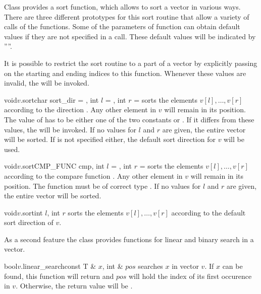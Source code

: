 Class  provides a sort function, which allows to sort a vector in various
ways.  There are three different prototypes for this sort routine that allow a variety of calls
of the functions.  Some of the parameters of function  can obtain default values if
they are not specified in a call.  These default values will be indicated by ''\DEF''.

It is possible to restrict the sort routine to a part of a vector by explicitly passing on the
starting and ending indices to this function.  Whenever these values are invalid, the \LEH will
be invoked.

\begin{fcode}{void}{$v$.sort}{char sort_dir = \DEF, int $l$ = \DEF, int $r$ = \DEF}
  sorts the elements $v[l], \dots, v[r]$ according to the direction .  Any other
  element in $v$ will remain in its position.  The value of  has to be either one of
  the two constants  or .  If it differs from these
  values, the \LEH will be invoked.  If no values for $l$ and $r$ are given, the entire vector
  will be sorted.  If  is not specified either, the default sort direction for $v$
  will be used.
\end{fcode}

\begin{fcode}{void}{$v$.sort}{CMP_FUNC cmp, int $l$ = \DEF, int $r$ = \DEF}
  sorts the elements $v[l], \dots, v[r]$ according to the compare function .  Any
  other element in $v$ will remain in its position.  The function  must be of
  correct type .  If no values for $l$ and $r$ are given, the entire vector will
  be sorted.
\end{fcode}

\begin{fcode}{void}{$v$.sort}{int $l$, int $r$}
  sorts the elements $v[l], \dots, v[r]$ according to the default sort direction of $v$.
\end{fcode}




As a second feature the class  provides functions for linear and binary
search in a vector.

\begin{cfcode}{bool}{$v$.linear_search}{const T & $x$, int & $\mathit{pos}$}
  searches $x$ in vector $v$.  If $x$ can be found, this function will return \TRUE and
  $\mathit{pos}$ will hold the index of its first occurence in $v$.  Otherwise, the return value
  will be \FALSE.
\end{cfcode}

